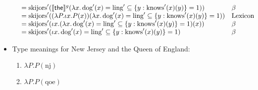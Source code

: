 \begin{itemize}
\[\begin{array}{c}
\begin{array}{r@{}ll}
			\\
			&{}= \text{skijors}'(\sv{\textsf{the}}^g(\lambda x.\,\text{dog}'(x) = \text{ling}' \subseteq \{y : \text{knows}'(x)(y)\} = 1)) & \beta%
			\\
			&{}= \text{skijors}'((\lambda P.\iota x.P(x))(\lambda x.\,\text{dog}'(x) = \text{ling}' \subseteq \{y : \text{knows}'(x)(y)\} = 1)) & \text{Lexicon}%
			\\
			&{}= \text{skijors}'(\iota x.(\lambda x.\,\text{dog}'(x) = \text{ling}' \subseteq \{y : \text{knows}'(x)(y)\} = 1)(x)) & \beta%
			\\
			&{}= \text{skijors}'(\iota x.\,\text{dog}'(x) = \text{ling}' \subseteq \{y : \text{knows}'(x)(y)\} = 1) & \beta%
		\end{array}
	\end{array}\]
	
	\item Type  meanings for \textsf{New Jersey} and \textsf{the Queen of England}:%
	\begin{enumerate}
		\item $\lambda P.P(\text{nj})$
		\item $\lambda P.P(\text{qoe})$
	\end{enumerate}
	
	

\end{itemize}
